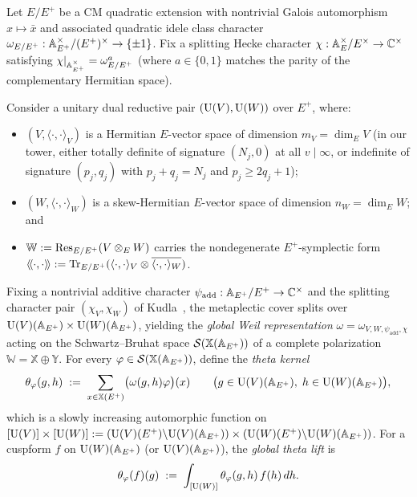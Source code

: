 Let $E / E^+$ be a CM quadratic extension with nontrivial Galois automorphism $x \mapsto \bar{x}$ and associated quadratic idele class character $\omega_{E/E^+} : \mathbb{A}_{E^+}^\times / (E^+)^\times \to \{\pm 1\}$. Fix a splitting Hecke character $\chi : \mathbb{A}_E^\times / E^\times \to \mathbb{C}^\times$ satisfying $\chi|_{\mathbb{A}_{E^+}^\times} = \omega_{E/E^+}^a$ (where $a \in \{0, 1\}$ matches the parity of the complementary Hermitian space).

Consider a unitary dual reductive pair $(\mathrm{U}(V), \mathrm{U}(W))$ over $E^+$, where:
\begin{itemize}
\item $(V, \langle \cdot, \cdot \rangle_V)$ is a Hermitian $E$-vector space of dimension $m_V = \dim_E V$ (in our tower, either totally definite of signature $(N_j, 0)$ at all $v \mid \infty$, or indefinite of signature $(p_j, q_j)$ with $p_j + q_j = N_j$ and $p_j \ge 2q_j + 1$);
\item $(W, \langle \cdot, \cdot \rangle_W)$ is a skew-Hermitian $E$-vector space of dimension $n_W = \dim_E W$; and
\item $\mathbb{W} := \operatorname{Res}_{E/E^+}(V \otimes_E W)$ carries the nondegenerate $E^+$-symplectic form $\langle\!\langle \cdot, \cdot \rangle\!\rangle := \operatorname{Tr}_{E/E^+}(\langle \cdot, \cdot \rangle_V \otimes \overline{\langle \cdot, \cdot \rangle_W})$.
\end{itemize}
Fixing a nontrivial additive character $\psi_{\mathrm{add}} : \mathbb{A}_{E^+}/E^+ \to \mathbb{C}^\times$ and the splitting character pair $(\chi_V, \chi_W)$ of Kudla~\cite{Kudla1994}, the metaplectic cover splits over $\mathrm{U}(V)(\mathbb{A}_{E^+}) \times \mathrm{U}(W)(\mathbb{A}_{E^+})$, yielding the \emph{global Weil representation} $\omega = \omega_{V, W, \psi_{\mathrm{add}}, \chi}$ acting on the Schwartz--Bruhat space $\mathcal{S}(\mathbb{X}(\mathbb{A}_{E^+}))$ of a complete polarization $\mathbb{W} = \mathbb{X} \oplus \mathbb{Y}$. For every $\varphi \in \mathcal{S}(\mathbb{X}(\mathbb{A}_{E^+}))$, define the \emph{theta kernel}
\begin{equation}
\label{eq:11:theta-kernel}
  \theta_\varphi(g, h) \;:=\; \sum_{x \in \mathbb{X}(E^+)} \bigl(\omega(g, h)\varphi\bigr)(x)
  \qquad \bigl(g \in \mathrm{U}(V)(\mathbb{A}_{E^+}),\; h \in \mathrm{U}(W)(\mathbb{A}_{E^+})\bigr),
\end{equation}
which is a slowly increasing automorphic function on $[\mathrm{U}(V)] \times [\mathrm{U}(W)] := (\mathrm{U}(V)(E^+)\backslash \mathrm{U}(V)(\mathbb{A}_{E^+})) \times (\mathrm{U}(W)(E^+)\backslash \mathrm{U}(W)(\mathbb{A}_{E^+}))$. For a cuspform $f$ on $\mathrm{U}(W)(\mathbb{A}_{E^+})$ (or $\mathrm{U}(V)(\mathbb{A}_{E^+})$), the \emph{global theta lift} is
\begin{equation}
\label{eq:11:theta-lift}
  \theta_\varphi(f)(g) \;:=\; \int_{[\mathrm{U}(W)]} \theta_\varphi(g, h)\, f(h)\, dh.
\end{equation}

